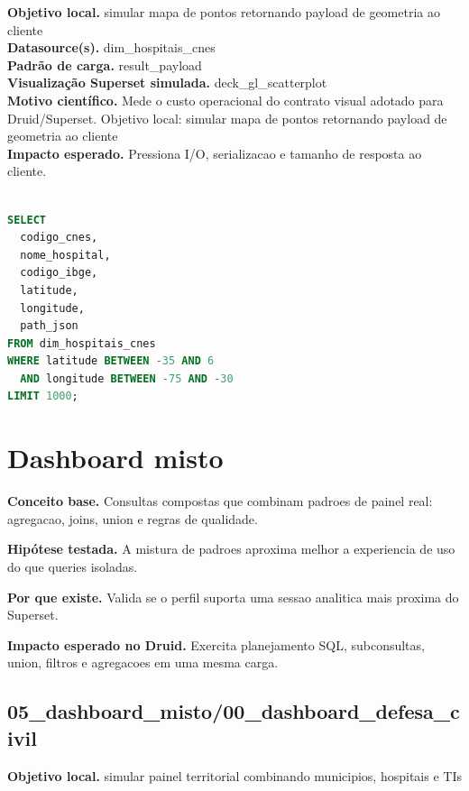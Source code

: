 \documentclass[11pt,a4paper]{article}
\begin{document}
\textbf{Objetivo local.} simular mapa de pontos retornando payload de geometria ao cliente\\

\textbf{Datasource(s).} dim\_hospitais\_cnes\\

\textbf{Padrão de carga.} result\_payload\\

\textbf{Visualização Superset simulada.} deck\_gl\_scatterplot\\

\textbf{Motivo científico.} Mede o custo operacional do contrato visual adotado para Druid/Superset. Objetivo local: simular mapa de pontos retornando payload de geometria ao cliente\\

\textbf{Impacto esperado.} Pressiona I/O, serializacao e tamanho de resposta ao cliente.

\begin{lstlisting}[language=SQL]

SELECT
  codigo_cnes,
  nome_hospital,
  codigo_ibge,
  latitude,
  longitude,
  path_json
FROM dim_hospitais_cnes
WHERE latitude BETWEEN -35 AND 6
  AND longitude BETWEEN -75 AND -30
LIMIT 1000;

\end{lstlisting}

\clearpage

\section{Dashboard misto}

\textbf{Conceito base.} Consultas compostas que combinam padroes de painel real: agregacao, joins, union e regras de qualidade.

\textbf{Hipótese testada.} A mistura de padroes aproxima melhor a experiencia de uso do que queries isoladas.

\textbf{Por que existe.} Valida se o perfil suporta uma sessao analitica mais proxima do Superset.

\textbf{Impacto esperado no Druid.} Exercita planejamento SQL, subconsultas, union, filtros e agregacoes em uma mesma carga.

\subsection{05\_dashboard\_misto/00\_dashboard\_defesa\_civil}

\textbf{Objetivo local.} simular painel territorial combinando municipios, hospitais e TIs\\
\end{document}
